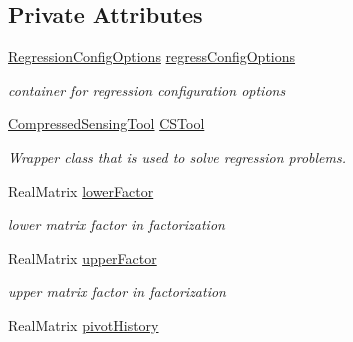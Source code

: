\subsection*{Private Attributes}
\begin{DoxyCompactItemize}
\item 
\hyperlink{classPecos_1_1RegressionConfigOptions}{Regression\+Config\+Options} \hyperlink{classPecos_1_1SharedRegressOrthogPolyApproxData_ab646839046eac941bd9cedcab25fa4fe}{regress\+Config\+Options}\label{classPecos_1_1SharedRegressOrthogPolyApproxData_ab646839046eac941bd9cedcab25fa4fe}

\begin{DoxyCompactList}\small\item\em container for regression configuration options \end{DoxyCompactList}\item 
\hyperlink{classPecos_1_1CompressedSensingTool}{Compressed\+Sensing\+Tool} \hyperlink{classPecos_1_1SharedRegressOrthogPolyApproxData_a0690bb1d9927c8a1de322b0bb230f163}{C\+S\+Tool}\label{classPecos_1_1SharedRegressOrthogPolyApproxData_a0690bb1d9927c8a1de322b0bb230f163}

\begin{DoxyCompactList}\small\item\em Wrapper class that is used to solve regression problems. \end{DoxyCompactList}\item 
Real\+Matrix \hyperlink{classPecos_1_1SharedRegressOrthogPolyApproxData_a01f8d3746f0c97337f566034011bb8df}{lower\+Factor}\label{classPecos_1_1SharedRegressOrthogPolyApproxData_a01f8d3746f0c97337f566034011bb8df}

\begin{DoxyCompactList}\small\item\em lower matrix factor in factorization \end{DoxyCompactList}\item 
Real\+Matrix \hyperlink{classPecos_1_1SharedRegressOrthogPolyApproxData_a2e65c47608334767a4257e1d4c8bf8ab}{upper\+Factor}\label{classPecos_1_1SharedRegressOrthogPolyApproxData_a2e65c47608334767a4257e1d4c8bf8ab}

\begin{DoxyCompactList}\small\item\em upper matrix factor in factorization \end{DoxyCompactList}\item 
Real\+Matrix \hyperlink{classPecos_1_1SharedRegressOrthogPolyApproxData_a2385691af90de846f94f98c72e9dd1a2}{pivot\+History}\label{classPecos_1_1SharedRegressOrthogPolyApproxData_a2385691af90de846f94f98c72e9dd1a2}


\end{DoxyCompactItemize}
